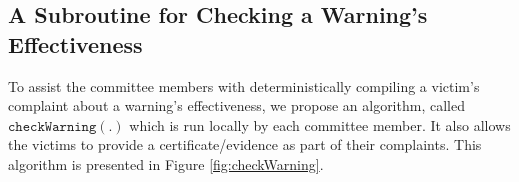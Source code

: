 

\subsection{A Subroutine for Checking a Warning's Effectiveness}



To assist the committee members with deterministically  compiling a victim's  complaint about a warning's  effectiveness, we propose an algorithm,  called $\mathtt{checkWarning}(.)$ which is run locally by each committee member. It also allows the victims to provide a certificate/evidence as part of their complaints.   This algorithm is presented in Figure \ref{fig:checkWarning}.




